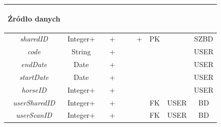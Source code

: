 \documentclass[12pt,oneside]{report}
\begin{document}
\begin{enumerate}[start=10,label={\bfseries REL\textbackslash\arabic*}]
\begin{table}[H]
\begin{tabular}{|c|c|c|c|c|c|c|c|c|c|}
			\begin{sideways}Źródło danych\end{sideways}\\
			\hline			
			\textit{sharedID}&Integer+&&+&&&+&PK&&SZBD\\
			\hline			
			\textit{code}&String&&+&&&&&&USER\\				
			\hline			
			\textit{endDate}&Date&&+&&&&&&USER\\
			\hline			
			\textit{startDate}&Date&&+&&&&&&USER\\				
			\hline
			\textit{horseID}&Integer+&&+&&&&&&USER\\				
			\hline
			\textit{userSharedID}&Integer+&&+&&&&FK&USER&BD\\				
			\hline
			\textit{userScanID}&Integer+&&+&&&&FK&USER&BD\\	
			\hline
		\end{tabular}
	\end{table}
	

\end{enumerate}
\end{document}
